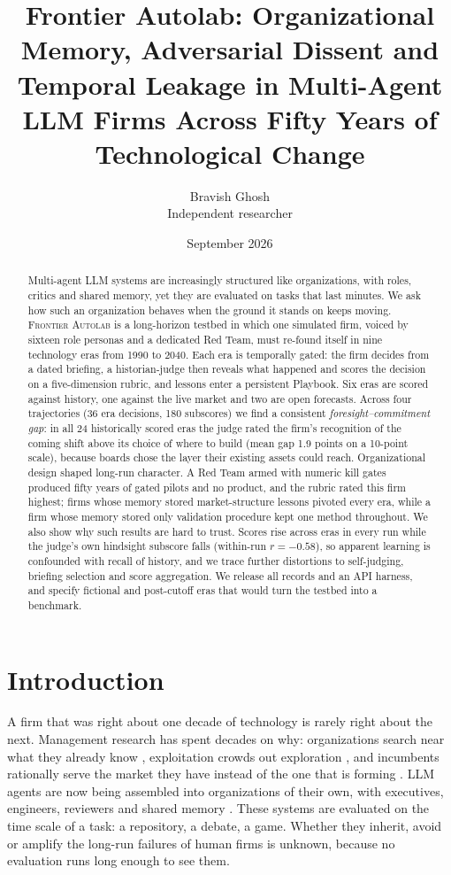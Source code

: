 \documentclass[11pt]{article}
\title{Frontier Autolab: Organizational Memory, Adversarial Dissent and Temporal Leakage in Multi-Agent LLM Firms Across Fifty Years of Technological Change}
\author{Bravish Ghosh\\
\small Independent researcher}
\date{September 2026}
\theoremstyle{definition}
\newcommand{\sys}{\textsc{Frontier Autolab}}
\begin{document}
\maketitle

\begin{abstract}
Multi-agent LLM systems are increasingly structured like organizations, with roles, critics and shared memory, yet they are evaluated on tasks that last minutes. We ask how such an organization behaves when the ground it stands on keeps moving. \sys{} is a long-horizon testbed in which one simulated firm, voiced by sixteen role personas and a dedicated Red Team, must re-found itself in nine technology eras from 1990 to 2040. Each era is temporally gated: the firm decides from a dated briefing, a historian-judge then reveals what happened and scores the decision on a five-dimension rubric, and lessons enter a persistent Playbook. Six eras are scored against history, one against the live market and two are open forecasts. Across four trajectories (36 era decisions, 180 subscores) we find a consistent \emph{foresight--commitment gap}: in all 24 historically scored eras the judge rated the firm's recognition of the coming shift above its choice of where to build (mean gap 1.9 points on a 10-point scale), because boards chose the layer their existing assets could reach. Organizational design shaped long-run character. A Red Team armed with numeric kill gates produced fifty years of gated pilots and no product, and the rubric rated this firm highest; firms whose memory stored market-structure lessons pivoted every era, while a firm whose memory stored only validation procedure kept one method throughout. We also show why such results are hard to trust. Scores rise across eras in every run while the judge's own hindsight subscore falls (within-run $r=-0.58$), so apparent learning is confounded with recall of history, and we trace further distortions to self-judging, briefing selection and score aggregation. We release all records and an API harness, and specify fictional and post-cutoff eras that would turn the testbed into a benchmark.
\end{abstract}

\section{Introduction}

A firm that was right about one decade of technology is rarely right about the next. Management research has spent decades on why: organizations search near what they already know \citep{cohen1990absorptive}, exploitation crowds out exploration \citep{march1991exploration}, and incumbents rationally serve the market they have instead of the one that is forming \citep{christensen1997innovator}. LLM agents are now being assembled into organizations of their own, with executives, engineers, reviewers and shared memory \citep{park2023generative,qian2024chatdev,hong2024metagpt,li2023camel,chen2024agentverse,guo2024survey}. These systems are evaluated on the time scale of a task: a repository, a debate, a game. Whether they inherit, avoid or amplify the long-run failures of human firms is unknown, because no evaluation runs long enough to see them.
\end{document}
